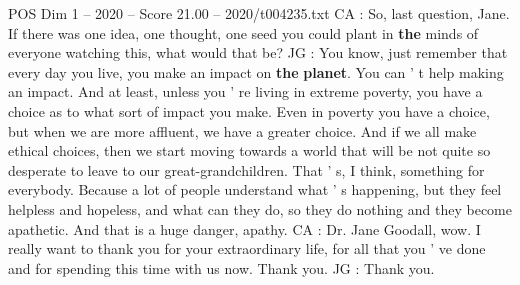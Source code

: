 \begin{textsample}{POS Dim 1 – 2020 – Score 21.00 – 2020/t004235.txt}
CA : So, last question, Jane.
If there was one idea, one thought, one seed you could plant in \textbf{the} minds of everyone watching this, what would that be?
JG : You know, just remember that every day you live, you make an impact on \textbf{the} \textbf{planet}.
You can ' t help making an impact.
And at least, unless you ' re living in extreme poverty, you have a choice as to what sort of impact you make.
Even in poverty you have a choice, but when we are more affluent, we have a greater choice.
And if we all make ethical choices, then we start moving towards a world that will be not quite so desperate to leave to our great-grandchildren.
That ' s, I think, something for everybody.
Because a lot of people understand what ' s happening, but they feel helpless and hopeless, and what can they do, so they do nothing and they become apathetic.
And that is a huge danger, apathy.
CA : Dr.
Jane Goodall, wow.
I really want to thank you for your extraordinary life, for all that you ' ve done and for spending this time with us now.
Thank you.
JG : Thank you.

\end{textsample}
